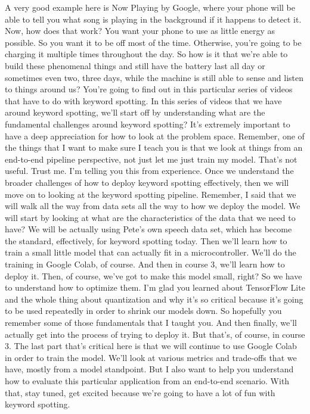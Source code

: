 A very good example here is Now Playing by Google,
where your phone will be able to tell you
what song is playing in the background if it happens to detect it.
Now, how does that work?
You want your phone to use as little energy as possible.
So you want it to be off most of the time.
Otherwise, you're going to be charging it multiple times throughout the day.
So how is it that we're able to build these phenomenal things
and still have the battery last all day or sometimes even two,
three days, while the machine is still able to sense
and listen to things around us?
You're going to find out in this particular series of videos
that have to do with keyword spotting.
In this series of videos that we have around keyword spotting,
we'll start off by understanding what are the fundamental challenges around
keyword spotting?
It's extremely important to have a deep appreciation
for how to look at the problem space.
Remember, one of the things that I want to make
sure I teach you is that we look at things from an end-to-end pipeline
perspective, not just let me just train my model.
That's not useful.
Trust me.
I'm telling you this from experience.
Once we understand the broader challenges
of how to deploy keyword spotting effectively,
then we will move on to looking at the keyword spotting pipeline.
Remember, I said that we will walk all the way
from data sets all the way to how we deploy the model.
We will start by looking at what are the characteristics of the data
that we need to have?
We will be actually using Pete's own speech data
set, which has become the standard, effectively,
for keyword spotting today.
Then we'll learn how to train a small little model that
can actually fit in a microcontroller.
We'll do the training in Google Colab, of course.
And then in course 3, we'll learn how to deploy it.
Then, of course, we've got to make this model small, right?
So we have to understand how to optimize them.
I'm glad you learned about TensorFlow Lite and the whole thing
about quantization and why it's so critical
because it's going to be used repeatedly in order to shrink our models down.
So hopefully you remember some of those fundamentals that I taught you.
And then finally, we'll actually get into the process
of trying to deploy it.
But that's, of course, in course 3.
The last part that's critical here is that we
will continue to use Google Colab in order to train the model.
We'll look at various metrics and trade-offs that we have,
mostly from a model standpoint.
But I also want to help you understand how
to evaluate this particular application from an end-to-end scenario.
With that, stay tuned, get excited because we're
going to have a lot of fun with keyword spotting.

